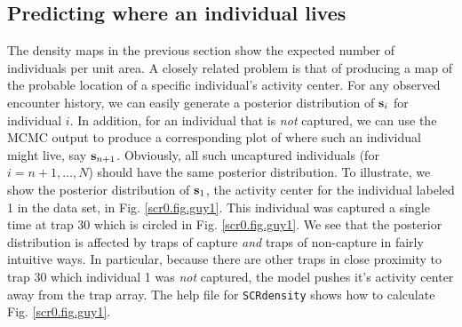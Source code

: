 {


\subsection{Predicting  where an individual lives}
\label{scr0.sec.post_s}

The density maps in the previous section show the expected number of
individuals per unit area.  A closely related problem is that of
producing a map of the probable location of a specific individual's
activity center.  For any observed encounter history, we can easily
generate a posterior distribution of ${\bf s}_{i}$ for individual $i$.
In addition, for an individual that is {\it not} captured, we can use
the MCMC output to produce a corresponding plot of where such an
individual might live, say ${\bf s}_{n+1}$.  Obviously, all such
uncaptured individuals (for $i=n+1,\ldots,N$) should have the same
posterior distribution.  To illustrate, we show the posterior
distribution of ${\bf s}_{1}$, the activity center for the individual
labeled 1 in the data set, in Fig. \ref{scr0.fig.guy1}. This
individual was captured a single time at trap 30 which is circled in
Fig. \ref{scr0.fig.guy1}.  We see that the posterior distribution is
affected by traps of capture {\it and} traps of non-capture in fairly
intuitive ways.  In particular, because there are other traps in close
proximity to trap 30 which individual 1 was {\it not} captured, the
model pushes it's activity center away from the trap array.  The help
file for \mbox{\tt SCRdensity} shows how to calculate
Fig. \ref{scr0.fig.guy1}.


}
